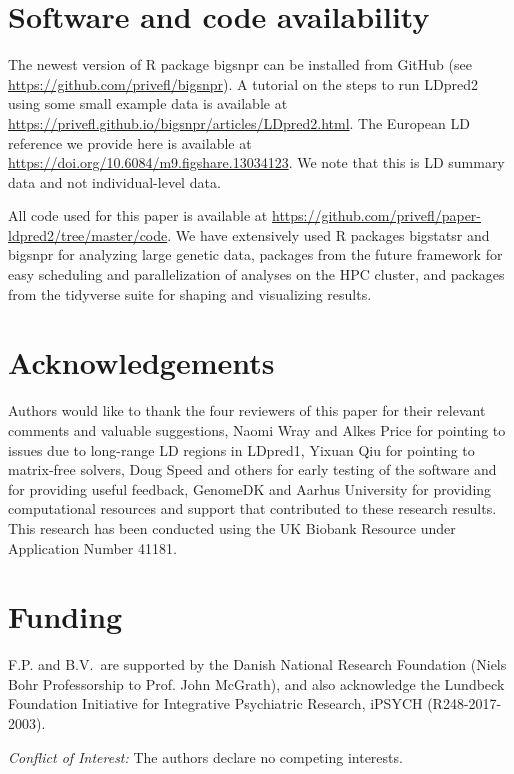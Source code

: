 \documentclass{bioinfo}
\begin{document}

\section*{Software and code availability}

The newest version of R package bigsnpr can be installed from GitHub (see \href{https://github.com/privefl/bigsnpr}{https://github.com/privefl/bigsnpr}).
A tutorial on the steps to run LDpred2 using some small example data is available at \href{https://privefl.github.io/bigsnpr/articles/LDpred2.html}{https://privefl.github.io/bigsnpr/articles/LDpred2.html}.
The European LD reference we provide here is available at \href{https://doi.org/10.6084/m9.figshare.13034123}{https://doi.org/10.6084/m9.figshare.13034123}. 
We note that this is LD summary data and not individual-level data.

All code used for this paper is available at \href{https://github.com/privefl/paper-ldpred2/tree/master/code}{https://github.com/privefl/paper-ldpred2/tree/master/code}. 
We have extensively used R packages bigstatsr and bigsnpr \cite[]{prive2017efficient} for analyzing large genetic data, packages from the future framework \cite[]{bengtsson2020unifying} for easy scheduling and parallelization of analyses on the HPC cluster, and packages from the tidyverse suite \cite[]{wickham2019welcome} for shaping and visualizing results.

\vspace*{-12pt}

\section*{Acknowledgements}

Authors would like to thank the four reviewers of this paper for their relevant comments and valuable suggestions, Naomi Wray and Alkes Price for pointing to issues due to long-range LD regions in LDpred1, Yixuan Qiu for pointing to matrix-free solvers, Doug Speed and others for early testing of the software and for providing useful feedback, GenomeDK and Aarhus University for providing computational resources and support that contributed to these research results.
This research has been conducted using the UK Biobank Resource under Application Number 41181.

\vspace*{-12pt}

\section*{Funding}

F.P. and B.V.\ are supported by the Danish National Research Foundation (Niels Bohr Professorship to Prof. John McGrath), and also acknowledge the Lundbeck Foundation Initiative for Integrative Psychiatric Research, iPSYCH (R248-2017-2003).

\noindent\emph{Conflict of Interest:} The authors declare no competing interests.




\end{document}
